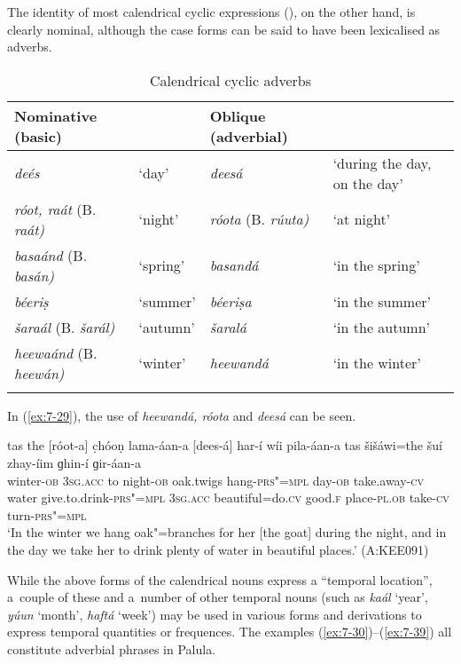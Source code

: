 The identity of most calendrical cyclic expressions (), on the other hand, is clearly nominal, although the  case forms can be said to have been lexicalised as adverbs. 


\begin{table}[ht]
\caption{Calendrical cyclic adverbs}
\begin{tabularx}{\textwidth}{ Q l l Q }
\lsptoprule
Nominative (basic) &
&
Oblique (adverbial) &
\\\hline
\textit{deés} &
`day' &
\textit{deesá} &
`during the day, on the day'\\
\textit{róot, raát} (B. \textit{raát)} &
`night' &
\textit{róota} (B. \textit{rúuta)} &
`at night'\\
\textit{basaánd} (B. \textit{basán)} &
`spring' &
\textit{basandá} &
`in the spring'\\
\textit{béeriṣ} &
`summer' &
\textit{béeriṣa} &
`in the summer'\\
\textit{šaraál} (B. \textit{šarál)} &
`autumn' &
\textit{šaralá} &
`in the autumn'\\
\textit{heewaánd} (B. \textit{heewán)} &
`winter' &
\textit{heewandá} &
`in the winter'\\\lspbottomrule
\end{tabularx}
\label{tab:7-2}
\end{table}


In (\ref{ex:7-29}), the use of \textit{heewandá, róota} and \textit{deesá} can be seen.

\begin{exe}
\ex
\label{ex:7-29}
\gll [heewand-á] tas the [róot-a] c̣hóoṇ  lama-áan-a [dees-á] har-í wíi
pila-áan-a tas šišáwi=the šuí zhay-íim ɡhin-í ɡir-áan-a\\
winter-\textsc{ob } \textsc{3sg.acc} to night-\textsc{ob} oak.twigs  hang-\textsc{prs"=mpl} day-\textsc{ob} take.away-\textsc{cv} water give.to.drink-\textsc{prs"=mpl} \textsc{3sg.acc}  beautiful=do.\textsc{cv} good.\textsc{f} place-\textsc{pl.ob} take-\textsc{cv} turn-\textsc{prs"=mpl} \\
\glt `In the winter we hang oak"=branches for her [the goat] during the night, and in the day we take her to drink plenty of water in beautiful places.' (A:KEE091)
\end{exe}

While the above  forms of the calendrical nouns express a ``temporal location'', a~couple of these and a~number of other temporal nouns (such as \textit{kaál} `year', \textit{yúun} `month', \textit{haftá} `week') may be used in various forms and derivations to express temporal quantities or frequences. The examples (\ref{ex:7-30})--(\ref{ex:7-39}) all constitute adverbial phrases in Palula.

